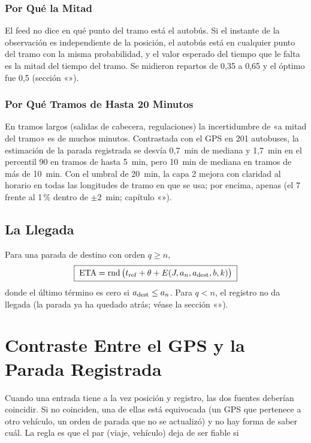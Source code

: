 \subsubsection{Por Qué la Mitad} El feed no dice en qué punto del tramo está el autobús. Si el instante de la observación
es independiente de la posición, el autobús está en cualquier punto del tramo con la misma probabilidad, y el valor
esperado del tiempo que le falta es la mitad del tiempo del tramo. Se midieron repartos de 0,35 a 0,65 y el óptimo fue
0,5 (sección «»).

\subsubsection{Por Qué Tramos de Hasta 20 Minutos} En tramos largos (salidas de cabecera, regulaciones) la incertidumbre
de «a mitad del tramo» es de muchos minutos. Contrastada con el GPS en 201 autobuses, la estimación de la parada
registrada se desvía 0,7~min de mediana y 1,7~min en el percentil 90 en tramos de hasta 5~min, pero 10~min de mediana
en tramos de más de 10~min. Con el umbral de 20~min, la capa 2 mejora con claridad al horario en todas las longitudes de tramo
en que se usa; por encima, apenas (el 7 frente al 1\,\% dentro de $\pm2$~min; capítulo «»).

\subsection{La Llegada}

Para una parada de destino con orden $q\ge n$,
\begin{equation}
\label{eq:eta-capa2}
\boxed{\;\mathrm{ETA}=\operatorname{rnd}\big(t_{\mathrm{ref}}+\theta+E(J,a_n,a_{\mathrm{dest}},b,k)\big)\;}
\end{equation}
donde el último término es cero si $a_{\mathrm{dest}}\le a_n$. Para $q<n$, el registro no da llegada (la parada ya ha quedado
atrás; véase la sección «»).

\section{Contraste Entre el GPS y la Parada Registrada}
\label{sec:desconfianza}

Cuando una entrada tiene a la vez posición y registro, las dos fuentes deberían coincidir. Si no coinciden, una de
ellas está equivocada (un GPS que pertenece a otro vehículo, un orden de parada que no se actualizó) y no
hay forma de saber cuál. La regla es que el par (viaje, vehículo) deja de ser fiable si

